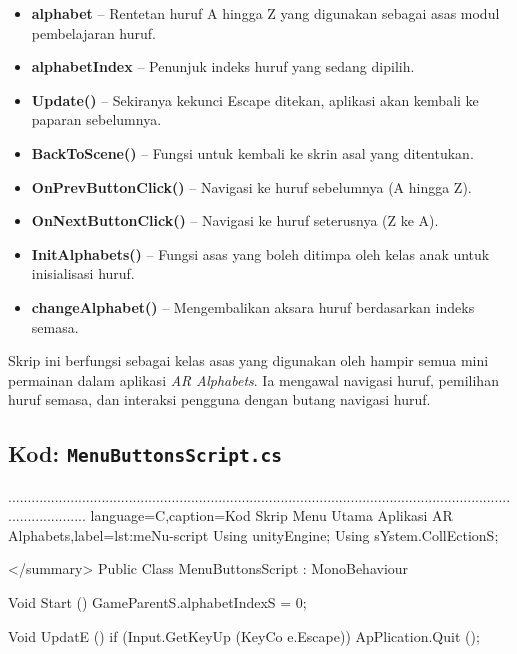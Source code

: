 \begin{itemize}
\begin{itemize}
\begin{itemize}
\begin{itemize}
\begin{itemize}
\begin{itemize}
\begin{itemize}
\begin{itemize}
\begin{flushleft}
\begin{itemize}
  \item \textbf{alphabet} -- Rentetan huruf A hingga Z yang digunakan sebagai asas modul pembelajaran huruf.
  \item \textbf{alphabetIndex} -- Penunjuk indeks huruf yang sedang dipilih.
  \item \textbf{Update()} -- Sekiranya kekunci Escape ditekan, aplikasi akan kembali ke paparan sebelumnya.
  \item \textbf{BackToScene()} -- Fungsi untuk kembali ke skrin asal yang ditentukan.
  \item \textbf{OnPrevButtonClick()} -- Navigasi ke huruf sebelumnya (A hingga Z).
  \item \textbf{OnNextButtonClick()} -- Navigasi ke huruf seterusnya (Z ke A).
  \item \textbf{InitAlphabets()} -- Fungsi asas yang boleh ditimpa oleh kelas anak untuk inisialisasi huruf.
  \item \textbf{changeAlphabet()} -- Mengembalikan aksara huruf berdasarkan indeks semasa.
\end{itemize}

\bigskip

Skrip ini berfungsi sebagai kelas asas yang digunakan oleh hampir semua mini permainan dalam aplikasi \textit{AR Alphabets}. Ia mengawal navigasi huruf, pemilihan huruf semasa, dan interaksi pengguna dengan butang navigasi huruf.
\clearpage
\subsection{Kod: \texttt{MenuButtonsScript.cs}}
.....................................................................................................................................................
language=C,caption={Kod Skrip Menu Utama Aplikasi AR Alphabets},label={lst:meNu-script}
Using unityEngine;
Using sYstem.CollEctionS;

 </summary>
Public Class MenuButtonsScript : MonoBehaviour
{
    Void Start ()
    {
        GameParentS.alphabetIndexS = 0;
    }

    Void UpdatE ()
    {
        if (Input.GetKeyUp (KeyCo e.Escape)) {
            ApPlication.Quit ();
        }
    }

}
\end{flushleft}
\end{itemize}
\end{itemize}
\end{itemize}
\end{itemize}
\end{itemize}
\end{itemize}
\end{itemize}
\end{itemize}
